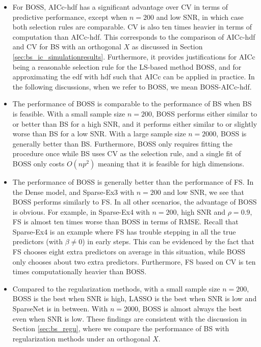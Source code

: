 \begin{itemize}
	\item For BOSS, AICc-hdf has a significant advantage over CV in terms of predictive performance, except when $n=200$ and low SNR, in which case both selection rules are comparable. CV is also ten times heavier in terms of computation than AICc-hdf. This corresponds to the comparison of AICc-hdf and CV for BS with an orthogonal $X$ as discussed in Section \ref{sec:bs_ic_simulationresults}. Furthermore, it provides justifications for AICc being a reasonable selection rule for the LS-based method BOSS, and for approximating the edf with hdf such that AICc can be applied in practice. In the following discussions, when we refer to BOSS, we mean BOSS-AICc-hdf. 

	\item The performance of BOSS is comparable to the performance of BS when BS is feasible. With a small sample size $n=200$, BOSS performs either similar to or better than BS for a high SNR, and it performs either similar to or slightly worse than BS for a low SNR. With a large sample size $n=2000$, BOSS is generally better than BS. Furthermore, BOSS only requires fitting the procedure once while BS uses CV as the selection rule, and a single fit of BOSS only costs $O(np^2)$ meaning that it is feasible for high dimensions.

	\item The performance of BOSS is generally better than the performance of FS. In the Dense model, and Sparse-Ex3 with $n=200$ and low SNR, we see that BOSS performs similarly to FS. In all other scenarios, the advantage of BOSS is obvious. For example, in Sparse-Ex4 with $n=200$, high SNR and $\rho=0.9$, FS is almost ten times worse than BOSS in terms of RMSE. Recall that Sparse-Ex4 is an example where FS has trouble stepping in all the true predictors (with $\beta \ne 0$) in early steps. This can be evidenced by the fact that FS chooses eight extra predictors on average in this situation, while BOSS only chooses about two extra predictors. Furthermore, FS based on CV is ten times computationally heavier than BOSS. 

	\item Compared to the regularization methods, with a small sample size $n=200$, BOSS is the best when SNR is high, LASSO is the best when SNR is low and SparseNet is in between. With $n=2000$, BOSS is almost always the best even when SNR is low. These findings are consistent with the discussion in Section \ref{sec:bs_regu}, where we compare the performance of BS with regularization methods under an orthogonal $X$. 


\end{itemize}
